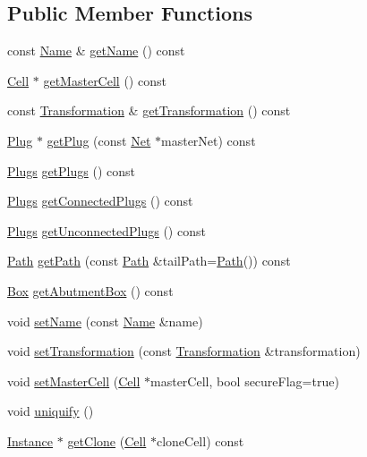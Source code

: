 \subsection*{Public Member Functions}
\begin{DoxyCompactItemize}
\item 
const \hyperlink{classHurricane_1_1Name}{Name} \& \hyperlink{classHurricane_1_1Instance_aa48280b4d7127d283c89983cf7a42c23}{get\+Name} () const
\item 
\hyperlink{classHurricane_1_1Cell}{Cell} $\ast$ \hyperlink{classHurricane_1_1Instance_ad08a772e5e36582070cdc407cfcc1a64}{get\+Master\+Cell} () const
\item 
const \hyperlink{classHurricane_1_1Transformation}{Transformation} \& \hyperlink{classHurricane_1_1Instance_a5042051d648fd93548dc6c5e14782645}{get\+Transformation} () const
\item 
\hyperlink{classHurricane_1_1Plug}{Plug} $\ast$ \hyperlink{classHurricane_1_1Instance_a1afe07edc0374ddfb505b4973c902834}{get\+Plug} (const \hyperlink{classHurricane_1_1Net}{Net} $\ast$master\+Net) const
\item 
\hyperlink{namespaceHurricane_ac8335d2057483ee7a935c15a9460c64f}{Plugs} \hyperlink{classHurricane_1_1Instance_a5433b64eed99f9a099004490fae6d8f4}{get\+Plugs} () const
\item 
\hyperlink{namespaceHurricane_ac8335d2057483ee7a935c15a9460c64f}{Plugs} \hyperlink{classHurricane_1_1Instance_a18beeab0def83c20e25a710b30dd8ca9}{get\+Connected\+Plugs} () const
\item 
\hyperlink{namespaceHurricane_ac8335d2057483ee7a935c15a9460c64f}{Plugs} \hyperlink{classHurricane_1_1Instance_a9622b8b961f459469c275b3dafe1733c}{get\+Unconnected\+Plugs} () const
\item 
\hyperlink{classHurricane_1_1Path}{Path} \hyperlink{classHurricane_1_1Instance_a4d13f5b9294d0361b724b5824fd86378}{get\+Path} (const \hyperlink{classHurricane_1_1Path}{Path} \&tail\+Path=\hyperlink{classHurricane_1_1Path}{Path}()) const
\item 
\hyperlink{classHurricane_1_1Box}{Box} \hyperlink{classHurricane_1_1Instance_a29bedbd05939bf43757ef036bb506d01}{get\+Abutment\+Box} () const
\item 
void \hyperlink{classHurricane_1_1Instance_ae3b67792d1659f1a20c6533b8843b905}{set\+Name} (const \hyperlink{classHurricane_1_1Name}{Name} \&name)
\item 
void \hyperlink{classHurricane_1_1Instance_a8890d2e1b2ba2542997454297e63512f}{set\+Transformation} (const \hyperlink{classHurricane_1_1Transformation}{Transformation} \&transformation)
\item 
void \hyperlink{classHurricane_1_1Instance_a9f626fd058c21ffc2ed5bfee8d29a853}{set\+Master\+Cell} (\hyperlink{classHurricane_1_1Cell}{Cell} $\ast$master\+Cell, bool secure\+Flag=true)
\item 
void \hyperlink{classHurricane_1_1Instance_adf28fcd01f6ff89c5435e83482f66d4c}{uniquify} ()
\item 
\hyperlink{classHurricane_1_1Instance}{Instance} $\ast$ \hyperlink{classHurricane_1_1Instance_ac5e111eef5767762e00f21fcd7a35702}{get\+Clone} (\hyperlink{classHurricane_1_1Cell}{Cell} $\ast$clone\+Cell) const
\end{DoxyCompactItemize}
